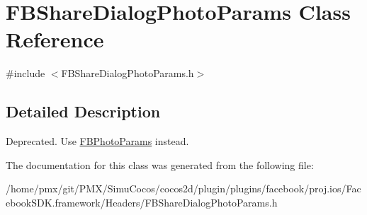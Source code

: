 \hypertarget{classFBShareDialogPhotoParams}{}\section{F\+B\+Share\+Dialog\+Photo\+Params Class Reference}
\label{classFBShareDialogPhotoParams}


{\ttfamily \#include $<$F\+B\+Share\+Dialog\+Photo\+Params.\+h$>$}



\subsection{Detailed Description}
Deprecated. Use {\ttfamily \hyperlink{interfaceFBPhotoParams}{F\+B\+Photo\+Params}} instead. 

The documentation for this class was generated from the following file\+:\begin{DoxyCompactItemize}
\item 
/home/pmx/git/\+P\+M\+X/\+Simu\+Cocos/cocos2d/plugin/plugins/facebook/proj.\+ios/\+Facebook\+S\+D\+K.\+framework/\+Headers/F\+B\+Share\+Dialog\+Photo\+Params.\+h\end{DoxyCompactItemize}
